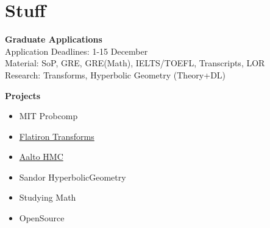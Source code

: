 \section{Stuff}

\noindent \textbf{\Huge Graduate Applications}\\[0.3cm]

\noindent Application Deadlines: 1-15 December\\
\noindent Material: SoP, GRE, GRE(Math), IELTS/TOEFL, Transcripts, LOR\\
\noindent Research: Transforms, Hyperbolic Geometry (Theory+DL)

\noindent \textbf{\Huge Projects}\\[0.3cm]

\begin{itemize}
    \item MIT Probcomp
    \item \hyperref[sec:transforms]{Flatiron Transforms}
    \item \hyperref[sec:aalto-hmc]{Aalto HMC}
    \item Sandor HyperbolicGeometry
    \item Studying Math
    \item OpenSource
\end{itemize}


